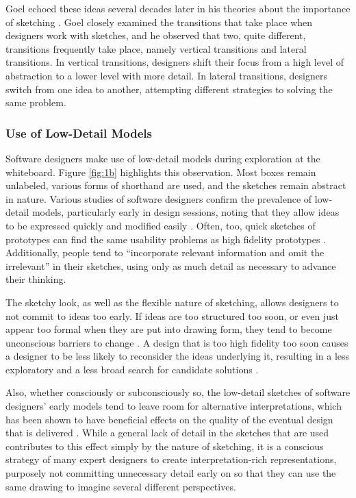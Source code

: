 Goel echoed these ideas several decades later in his theories about the importance of sketching \citep{Goel}. Goel closely examined the transitions that take place when designers work with sketches, and he observed that two, quite different, transitions frequently take place, namely vertical transitions and lateral transitions. In vertical transitions, designers shift their focus from a high level of abstraction to a lower level with more detail. In lateral transitions, designers switch from one idea to another, attempting different strategies to solving the same problem.

\subsubsection{Use of Low-Detail Models}
\label{behaviorsofsoftwaredesignerswhilesketching:2}
Software designers make use of low-detail models during exploration at the whiteboard. Figure \ref{fig:1b} highlights this observation. Most boxes remain unlabeled, various forms of shorthand are used, and the sketches remain abstract in nature. Various studies of software designers confirm the prevalence of low-detail models, particularly early in design sessions, noting that they allow ideas to be expressed quickly and modified easily \citep{Cherubini,Petre}. Often, too, quick sketches of prototypes can find the same usability problems as high fidelity prototypes \citep{Virzi}. Additionally, people tend to ``incorporate relevant information and omit the irrelevant'' \citep{Tversky} in their sketches, using only as much detail as necessary to advance their thinking.

The sketchy look, as well as the flexible nature of sketching, allows designers to not commit to ideas too early. If ideas are too structured too soon, or even just appear too formal when they are put into drawing form, they tend to become unconscious barriers to change \citep{Wong}. A design that is too high fidelity too soon causes a designer to be less likely to reconsider the ideas underlying it, resulting in a less exploratory and a less broad search for candidate solutions \citep{Wong}.

Also, whether consciously or subconsciously so, the low-detail sketches of software designers' early models tend to leave room for alternative interpretations, which has been shown to have beneficial effects on the quality of the eventual design that is delivered \citep{Goel,Yamamoto}. While a general lack of detail in the sketches that are used contributes to this effect simply by the nature of sketching, it is a conscious strategy of many expert designers to create interpretation-rich representations, purposely not committing unnecessary detail early on so that they can use the same drawing to imagine several different perspectives. 

